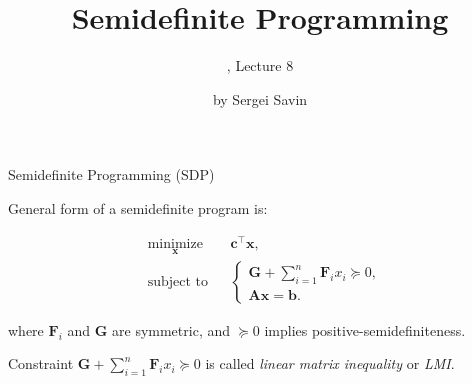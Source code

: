 \documentclass{beamer}
\title{Semidefinite Programming}
\subtitle{\mycoursetitle, Lecture 8}
\author{by Sergei Savin}
\date{\mydate}
\begin{document}
\maketitle


%



\begin{frame}{Semidefinite Programming (SDP)}
\begin{flushleft}

General form of a semidefinite program is:

%
\begin{equation}
\begin{aligned}
& \underset{\mathbf{x}}{\text{minimize}}
& & \mathbf{c}^\top\mathbf{x}, \\
& \text{subject to}
& & \begin{cases}
    \mathbf{G} + \sum\limits_{i=1}^n \mathbf{F}_i x_i \succeq 0, \\
    \mathbf{A}\mathbf{x} = \mathbf{b}.
    \end{cases}
\end{aligned}
\end{equation}

where $\mathbf{F}_i $ and $\mathbf{G}$ are symmetric, and $\succeq 0$ implies positive-semidefiniteness.

\bigskip

Constraint $\mathbf{G} + \sum\limits_{i=1}^n \mathbf{F}_i x_i \succeq 0$ is called \emph{linear matrix inequality} or \emph{LMI}.
 
\end{flushleft}
\end{frame}
\end{document}
